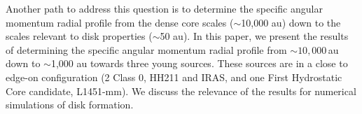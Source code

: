 Another path to address this question is to determine the specific angular momentum radial profile from the dense core scales ($\sim$10,000 au) 
down to the scales relevant to disk properties ($\sim$50 au). 
%
In this paper, we present the results of determining the specific angular momentum radial profile from 
$\sim 10,000$\,au down to $\sim$1,000 au towards three young sources.
These sources are in a close to edge-on configuration (2 Class 0, HH211 and IRAS, and one First Hydrostatic Core candidate, L1451-mm).
We discuss the relevance of the results for numerical simulations of disk formation. 